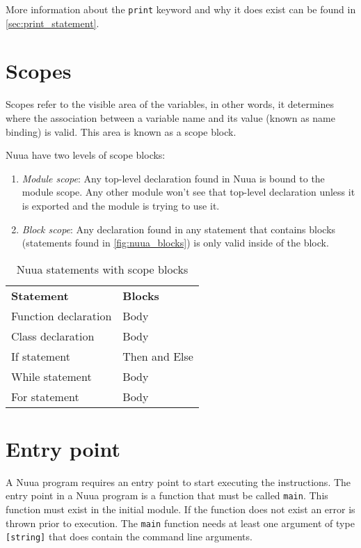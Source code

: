 More information about the \texttt{print} keyword and why it does exist can be found in \autoref{sec:print_statement}.

\section{Scopes}
\label{sec:nuua_scopes}

Scopes refer to the visible area of the variables, in other words, it determines where the association between a variable name
and its value (known as name binding) is valid. This area is known as a scope block.

Nuua have two levels of scope blocks:

\begin{enumerate}
    \item \emph{Module scope}: Any top-level declaration found in Nuua is bound to the module scope. Any other module won't see that
        top-level declaration unless it is exported and the module is trying to use it.
    \item \emph{Block scope}: Any declaration found in any statement that contains blocks (statements found in \autoref{fig:nuua_blocks})
        is only valid inside of the block.
\end{enumerate}

\begin{table}[H]
    \centering
    \begin{tabular}{ l l }
        \textbf{Statement} & \textbf{Blocks} \\
        Function declaration & Body \\
        Class declaration & Body \\
        If statement & Then and Else \\
        While statement & Body \\
        For statement & Body \\
    \end{tabular}
    \caption{Nuua statements with scope blocks}
    \label{fig:nuua_blocks}
\end{table}

\section{Entry point}

A Nuua program requires an entry point to start executing the instructions. The entry point in a Nuua program is a
function that must be called \texttt{main}. This function must exist in the initial module. If the function does not
exist an error is thrown prior to execution. The \texttt{main} function needs at least one argument of type \texttt{[string]}
that does contain the command line arguments.

